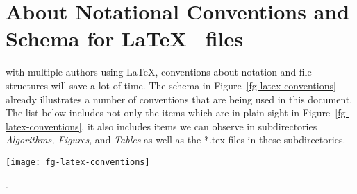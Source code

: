 \section{About Notational Conventions and Schema for \LaTeX~ files}
\label{chap-About-Conventions}

 with multiple authors using \LaTeX,
conventions about notation and file structures
will save a lot of time.
The schema in Figure~\ref{fg-latex-conventions} already illustrates
a number of conventions that are being  used in this document. 
The list below includes not only the items which are in plain sight in Figure~\ref{fg-latex-conventions}, it also includes items we can observe in subdirectories {\em Algorithms, Figures}, and {\em Tables} as well as the *.tex files in these subdirectories.
\begin{marginfigure}[13ex]%
  \texttt{[image: fg-latex-conventions]}
  \caption[Example file fg-latex-conventions.tex]
  {Notational conventions and schema for \LaTeX~files to support collaboration.}
  \label{fg-latex-conventions}
\end{marginfigure}.
